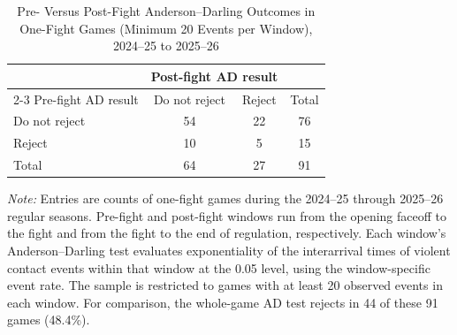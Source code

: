 \begin{table}[htbp]
\centering
\caption{Pre- Versus Post-Fight Anderson--Darling Outcomes in One-Fight Games (Minimum 20 Events per Window), 2024--25 to 2025--26}
\label{tab:one_fight_AD_rejection_min_20_20242025_20252026}
\small
\renewcommand{\arraystretch}{1.15}
\setlength{\tabcolsep}{6pt}

\begin{tabular*}{0.78\textwidth}{@{\extracolsep{\fill}}lccc}
\toprule
 & \multicolumn{2}{c}{Post-fight AD result} & \\
\cmidrule(lr){2-3}
Pre-fight AD result & Do not reject & Reject & Total \\
\midrule
Do not reject & 54 & 22 & 76 \\
Reject & 10 & 5 & 15 \\
\midrule
Total & 64 & 27 & 91 \\
\bottomrule
\end{tabular*}

\vspace{0.4em}
\parbox{0.78\textwidth}{
\footnotesize
\textit{Note:} Entries are counts of one-fight games during the 2024--25 through 2025--26 regular seasons. Pre-fight and post-fight windows run from the opening faceoff to the fight and from the fight to the end of regulation, respectively. Each window's Anderson--Darling test evaluates exponentiality of the interarrival times of violent contact events within that window at the 0.05 level, using the window-specific event rate. The sample is restricted to games with at least 20 observed events in each window. For comparison, the whole-game AD test rejects in 44 of these 91 games (48.4\%).
}
\end{table}
